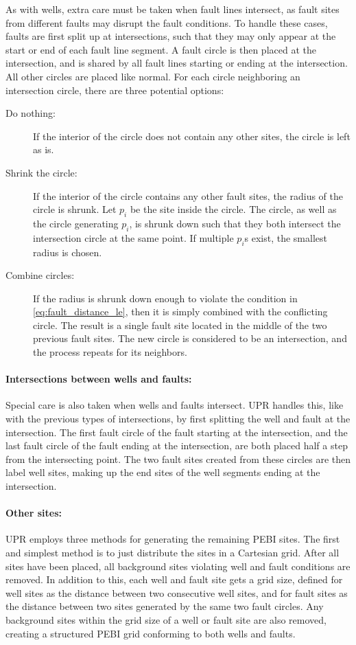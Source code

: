 As with wells, extra care must be taken when fault lines intersect, as fault sites from different faults may disrupt the fault conditions. To handle these cases, faults are first split up at intersections, such that they may only appear at the start or end of each fault line segment. A fault circle is then placed at the intersection, and is shared by all fault lines starting or ending at the intersection. All other circles are placed like normal. For each circle neighboring an intersection circle, there are three potential options:
\begin{description}
    \item[Do nothing:] If the interior of the circle does not contain any other sites, the circle is left as is.
    \item[Shrink the circle:] If the interior of the circle contains any other fault sites, the radius of the circle is shrunk. Let $p_i$ be the site inside the circle. The circle, as well as the circle generating $p_i$, is shrunk down such that they both intersect the intersection circle at the same point. If multiple $p_i$s exist, the smallest radius is chosen.
    \item[Combine circles:] If the radius is shrunk down enough to violate the condition in \autoref{eq:fault_distance_le}, then it is simply combined with the conflicting circle. The result is a single fault site located in the middle of the two previous fault sites. The new circle is considered to be an intersection, and the process repeats for its neighbors.
\end{description}

\paragraph{Intersections between wells and faults:}
\label{UPR:intersections}
Special care is also taken when wells and faults intersect. UPR handles this, like with the previous types of intersections, by first splitting the well and fault at the intersection. The first fault circle of the fault starting at the intersection, and the last fault circle of the fault ending at the intersection, are both placed half a step from the intersecting point. The two fault sites created from these circles are then label well sites, making up the end sites of the well segments ending at the intersection.

\paragraph{Other sites:}
UPR employs three methods for generating the remaining PEBI sites. The first and simplest method is to just distribute the sites in a Cartesian grid. After all sites have been placed, all background sites violating well and fault conditions are removed. In addition to this, each well and fault site gets a grid size, defined for well sites as the distance between two consecutive well sites, and for fault sites as the distance between two sites generated by the same two fault circles. Any background sites within the grid size of a well or fault site are also removed, creating a structured PEBI grid conforming to both wells and faults.

